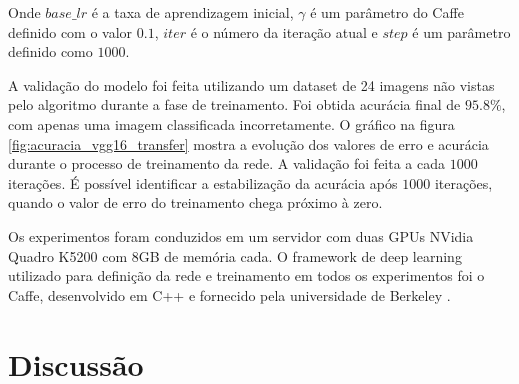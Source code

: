 \documentclass[conference]{IEEEtran}
\begin{document}
  Onde $base\_lr$ é a taxa de aprendizagem inicial, $\gamma$ é um parâmetro do Caffe definido com o valor $0.1$, $iter$ é o número da iteração atual e $step$ é um parâmetro definido como $1000$.

  A validação do modelo foi feita utilizando um dataset de 24 imagens não vistas pelo algoritmo durante a fase de treinamento. Foi obtida acurácia final de $95.8\%$, com apenas uma imagem classificada incorretamente. O gráfico na figura \ref{fig:acuracia_vgg16_transfer} mostra a evolução dos valores de erro e acurácia durante o processo de treinamento da rede. A validação foi feita a cada $1000$ iterações. É possível identificar a estabilização da acurácia após $1000$ iterações, quando o valor de erro do treinamento chega próximo à zero.

  Os experimentos foram conduzidos em um servidor com duas GPUs NVidia Quadro K5200 com 8GB de memória cada. O framework de deep learning utilizado para definição da rede e treinamento em todos os experimentos foi o Caffe, desenvolvido em C++ e fornecido pela universidade de Berkeley \cite{jia2014caffe}.





\section{Discussão}
\end{document}
